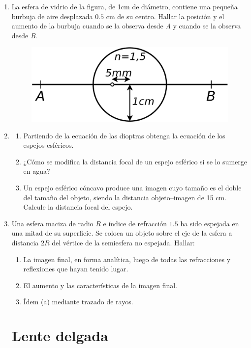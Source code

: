 \documentclass[11pt,spanish,a4paper]{article}
\begin{document}
\begin{enumerate}
\item La esfera de vidrio de la figura, de 1cm de diámetro, contiene una
pequeña burbuja de aire desplazada $0.5$ cm de su centro. Hallar
la posición y el aumento de la burbuja cuando se la observa desde
\emph{A} y cuando se la observa desde \emph{B}.
\begin{figure}[H]
\centering{}\includegraphics[clip,scale=0.25]{ej3-17}
\end{figure}


\item
\begin{enumerate}
\item Partiendo de la ecuación de las dioptras obtenga la ecuación de los
espejos esféricos. 
\item ¿Cómo se modifica la distancia focal de un espejo esférico si se lo
sumerge en agua?
\item Un espejo esférico cóncavo produce una imagen cuyo tamaño es el doble
del tamaño del objeto, siendo la distancia objeto--imagen de 15 cm.
Calcule la distancia focal del espejo.
\end{enumerate}


\item Una esfera maciza de radio $R$ e índice de refracción $1.5$ ha sido
espejada en una mitad de su superficie. Se coloca un objeto sobre
el eje de la esfera a distancia $2R$ del vértice de la semiesfera
no espejada. Hallar:
\begin{enumerate}
\item La imagen final, en forma analítica, luego de todas las refracciones
y reflexiones que hayan tenido lugar.
\item El aumento y las características de la imagen final.
\item Ídem (a) mediante trazado de rayos.
\end{enumerate}


\section*{Lente delgada}


\end{enumerate}
\end{document}
